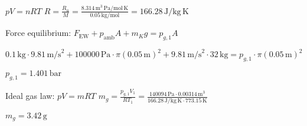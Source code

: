\( p V = n R T \)  
\( R = \frac{R_u}{M} = \frac{8.314 \, \text{m}^3 \, \text{Pa}/\text{mol} \, \text{K}}{0.05 \, \text{kg/mol}} = 166.28 \, \text{J}/\text{kg} \, \text{K} \)  

Force equilibrium:  
\( F_{\text{EW}} + p_{\text{amb}} A + m_K g = p_{g,1} A \)  

\( 0.1 \, \text{kg} \cdot 9.81 \, \text{m/s}^2 + 100000 \, \text{Pa} \cdot \pi (0.05 \, \text{m})^2 + 9.81 \, \text{m/s}^2 \cdot 32 \, \text{kg} = p_{g,1} \cdot \pi (0.05 \, \text{m})^2 \)  

\( p_{g,1} = 1.401 \, \text{bar} \)  

Ideal gas law:  
\( p V = m R T \)  
\( m_g = \frac{p_{g,1} V_1}{R T_1} = \frac{140094 \, \text{Pa} \cdot 0.00314 \, \text{m}^3}{166.28 \, \text{J}/\text{kg} \, \text{K} \cdot 773.15 \, \text{K}} \)  

\( m_g = 3.42 \, \text{g} \)